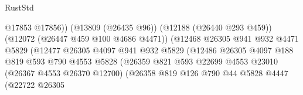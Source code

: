\begin{lexlean}{RustStd}
\begin{coremodule}
                                                    @17853
                                                    @17856))
                                                (@13809 (@26435 @96))
                                                (@12188 (@26440 @293 @459))
                                                (@12072 (@26447 @459 @100 @4686 @4471))
                                                (@12468
                                                  @26305
                                                  @941
                                                  @932
                                                  @4471
                                                  @5829
                                                  (@12477
                                                    @26305
                                                    @4097
                                                    @941
                                                    @932
                                                    @5829
                                                    (@12486
                                                      @26305
                                                      @4097
                                                      @188
                                                      @819
                                                      @593
                                                      @790
                                                      @4553
                                                      @5828
                                                      (@26359
                                                        @821
                                                        @593
                                                        @22699
                                                        @4553
                                                        @23010
                                                        (@26367 @4553 @26370 @12700)
                                                        (@26358
                                                          @819
                                                          @126
                                                          @790
                                                          @44
                                                          @5828
                                                          @4447
                                                          (@22722
                                                            @26305

\end{coremodule}
\end{lexlean}
